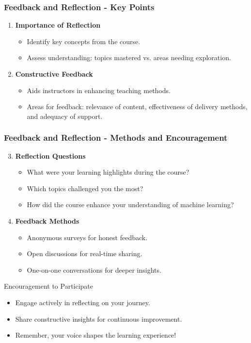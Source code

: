 \documentclass[aspectratio=169]{beamer}
\begin{document}
\begin{frame}[fragile]
    \frametitle{Feedback and Reflection - Key Points}
    \begin{enumerate}
        \item \textbf{Importance of Reflection}
        \begin{itemize}
            \item Identify key concepts from the course.
            \item Assess understanding: topics mastered vs. areas needing exploration.
        \end{itemize}

        \item \textbf{Constructive Feedback}
        \begin{itemize}
            \item Aids instructors in enhancing teaching methods.
            \item Areas for feedback: relevance of content, effectiveness of delivery methods, and adequacy of support.
        \end{itemize}
    \end{enumerate}
\end{frame}

\begin{frame}[fragile]
    \frametitle{Feedback and Reflection - Methods and Encouragement}
    \begin{enumerate}
        \setcounter{enumi}{2}
        \item \textbf{Reflection Questions}
        \begin{itemize}
            \item What were your learning highlights during the course?
            \item Which topics challenged you the most?
            \item How did the course enhance your understanding of machine learning?
        \end{itemize}

        \item \textbf{Feedback Methods}
        \begin{itemize}
            \item Anonymous surveys for honest feedback.
            \item Open discussions for real-time sharing.
            \item One-on-one conversations for deeper insights.
        \end{itemize}
    \end{enumerate}

    \begin{block}{Encouragement to Participate}
        \begin{itemize}
            \item Engage actively in reflecting on your journey.
            \item Share constructive insights for continuous improvement.
            \item Remember, your voice shapes the learning experience!
        \end{itemize}
    \end{block}
\end{frame}
\end{document}
